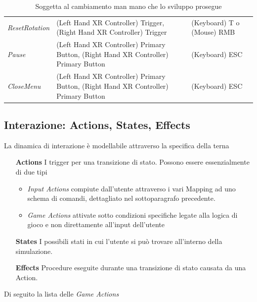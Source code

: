 \documentclass[10pt, openany]{article}
\begin{document}
\begin{table}[h!]
\begin{tabular}{@{} p{} p{} p{} @{}}
        \textit{ResetRotation} & (Left Hand XR Controller) Trigger, (Right Hand XR Controller) Trigger & (Keyboard) T o (Mouse) RMB \\ 
        \textit{Pause} & (Left Hand XR Controller) Primary Button, (Right Hand XR Controller) Primary Button & (Keyboard) ESC \\
        \textit{CloseMenu} & (Left Hand XR Controller) Primary Button, (Right Hand XR Controller) Primary Button & (Keyboard) ESC \\
        \bottomrule
      \end{tabular}
      \caption{Soggetta al cambiamento man mano che lo sviluppo prosegue}
    \end{table}
    \subsection{Interazione: Actions, States, Effects}
    La dinamica di interazione \`e modellabile attraverso la specifica della terna
    \begin{itemize}[leftmargin=15mm, topsep=0pt, noitemsep]
      \item[\textbf{Actions}] I trigger per una transizione di stato. Possono essere essenzialmente di due tipi
        \begin{itemize}[topsep=0pt, noitemsep]
          \item \textit{Input Actions} compiute dall'utente attraverso i vari Mapping ad uno schema di comandi, dettagliato nel sottoparagrafo precedente.
          \item \textit{Game Actions} attivate sotto condizioni specifiche legate alla logica di gioco e non direttamente all'input dell'utente
        \end{itemize}
      \item[\textbf{States}] I possibili stati in cui l'utente si pu\`o trovare all'interno della simulazione.
      \item[\textbf{Effects}] Procedure eseguite durante una transizione di stato causata da una Action.
    \end{itemize}
    Di seguito la lista delle \textit{Game Actions}
\end{document}
